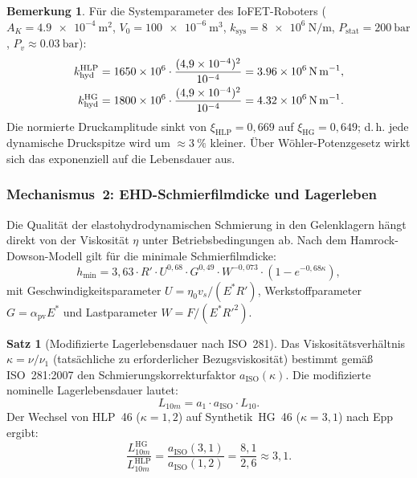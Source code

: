 ﻿\documentclass[a4paper,12pt]{scrreprt}
\theoremstyle{definition}
\newtheorem{bemerkung}{Bemerkung}[section]
\newtheorem{satz}{Satz}[section]
\begin{document}
\begin{bemerkung}
Für die Systemparameter des IoFET-Roboters ($A_K = \SI{4.9e-4}{\meter\squared}$,
$V_0 = \SI{100e-6}{\meter\cubed}$,
$k_{\text{sys}} = \SI{8e6}{\newton\per\meter}$,
$P_{\text{stat}} = \SI{200}{\bar}$, $P_v \approx \SI{0.03}{\bar}$):
\begin{align*}
  k_{\text{hyd}}^{\text{HLP}} &= 1650 \times 10^6 \cdot
    \frac{(4{,}9 \times 10^{-4})^2}{10^{-4}}
    = \SI{3{,}96e6}{\newton\per\meter},\\
  k_{\text{hyd}}^{\text{HG}} &= 1800 \times 10^6 \cdot
    \frac{(4{,}9 \times 10^{-4})^2}{10^{-4}}
    = \SI{4{,}32e6}{\newton\per\meter}.
\end{align*}
Die normierte Druckamplitude sinkt von $\xi_{\text{HLP}} = 0{,}669$ auf
$\xi_{\text{HG}} = 0{,}649$; d.\,h. jede dynamische Druckspitze wird
um $\approx\SI{3}{\percent}$ kleiner. Über Wöhler-Potenzgesetz wirkt sich
das exponenziell auf die Lebensdauer aus.
\end{bemerkung}

\subsubsection{Mechanismus~2: EHD-Schmierfilmdicke und Lagerleben}

Die Qualität der elastohydrodynamischen Schmierung in den Gelenklagern
hängt direkt von der Viskosität $\eta$ unter Betriebsbedingungen ab.
Nach dem Hamrock-Dowson-Modell gilt für die minimale Schmierfilmdicke:
\begin{equation}
  h_{\min} = 3{,}63 \cdot R' \cdot U^{0{,}68} \cdot G^{0{,}49}
             \cdot W^{-0{,}073} \cdot (1 - e^{-0{,}68\kappa}),
  \label{eq:hamrock}
\end{equation}
mit Geschwindigkeitsparameter $U = \eta_0 v_s / (E^* R')$,
Werkstoffparameter $G = \alpha_{\text{pv}} E^*$ und
Lastparameter $W = F/(E^* {R'}^2)$.

\begin{satz}[Modifizierte Lagerlebensdauer nach ISO~281]
\label{satz:lagerlebensdauer}
Das Viskositätsverhältnis $\kappa = \nu / \nu_1$ (tatsächliche zu
erforderlicher Bezugsviskosität) bestimmt gemäß ISO~281:2007 den
Schmierungskorrekturfaktor $a_{\text{ISO}}(\kappa)$. Die modifizierte
nominelle Lagerlebensdauer lautet:
\begin{equation}
  L_{10m} = a_1 \cdot a_{\text{ISO}} \cdot L_{10}.
  \label{eq:l10m}
\end{equation}
Der Wechsel von HLP~46 ($\kappa = 1{,}2$) auf Synthetik~HG~46
($\kappa = 3{,}1$) nach Epp~\cite{hydr2026} ergibt:
\begin{equation}
  \frac{L_{10m}^{\text{HG}}}{L_{10m}^{\text{HLP}}}
  = \frac{a_{\text{ISO}}(3{,}1)}{a_{\text{ISO}}(1{,}2)}
  = \frac{8{,}1}{2{,}6} \approx 3{,}1.
  \label{eq:lebensdauerfaktor}
\end{equation}
\end{satz}
\end{document}
